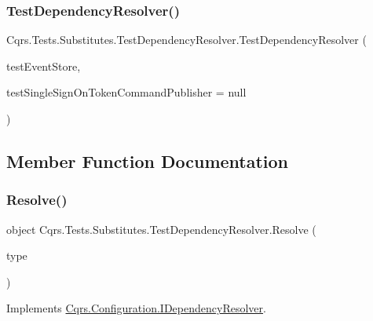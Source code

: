 \subsubsection{\texorpdfstring{Test\+Dependency\+Resolver()}{TestDependencyResolver()}}
{\footnotesize\ttfamily Cqrs.\+Tests.\+Substitutes.\+Test\+Dependency\+Resolver.\+Test\+Dependency\+Resolver (\begin{DoxyParamCaption}\item[{\hyperlink{classCqrs_1_1Tests_1_1Substitutes_1_1TestEventStore}{Test\+Event\+Store}}]{test\+Event\+Store,  }\item[{\hyperlink{interfaceCqrs_1_1Commands_1_1ICommandPublisher}{I\+Command\+Publisher}$<$ \hyperlink{interfaceCqrs_1_1Authentication_1_1ISingleSignOnToken}{I\+Single\+Sign\+On\+Token} $>$}]{test\+Single\+Sign\+On\+Token\+Command\+Publisher = {\ttfamily null} }\end{DoxyParamCaption})}



\subsection{Member Function Documentation}
\mbox{\label{classCqrs_1_1Tests_1_1Substitutes_1_1TestDependencyResolver_a05767824475ea6affbf6f70cf5b1fd06}} 
\subsubsection{\texorpdfstring{Resolve()}{Resolve()}}
{\footnotesize\ttfamily object Cqrs.\+Tests.\+Substitutes.\+Test\+Dependency\+Resolver.\+Resolve (\begin{DoxyParamCaption}\item[{Type}]{type }\end{DoxyParamCaption})}



Implements \hyperlink{interfaceCqrs_1_1Configuration_1_1IDependencyResolver_aa455096b7b94fc1d64904bc67830ec06}{Cqrs.\+Configuration.\+I\+Dependency\+Resolver}.

\mbox{\label{classCqrs_1_1Tests_1_1Substitutes_1_1TestDependencyResolver_a67090a882241fa6a881d49c91c95cad7}} 
